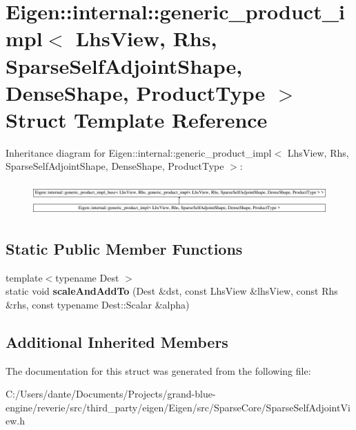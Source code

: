 \hypertarget{struct_eigen_1_1internal_1_1generic__product__impl_3_01_lhs_view_00_01_rhs_00_01_sparse_self_adj0d7cb22d06770c150f0f74fa6f4e5968}{}\section{Eigen\+::internal\+::generic\+\_\+product\+\_\+impl$<$ Lhs\+View, Rhs, Sparse\+Self\+Adjoint\+Shape, Dense\+Shape, Product\+Type $>$ Struct Template Reference}
\label{struct_eigen_1_1internal_1_1generic__product__impl_3_01_lhs_view_00_01_rhs_00_01_sparse_self_adj0d7cb22d06770c150f0f74fa6f4e5968}
Inheritance diagram for Eigen\+::internal\+::generic\+\_\+product\+\_\+impl$<$ Lhs\+View, Rhs, Sparse\+Self\+Adjoint\+Shape, Dense\+Shape, Product\+Type $>$\+:\begin{figure}[H]
\begin{center}
\leavevmode
\includegraphics[height=1.237569cm]{struct_eigen_1_1internal_1_1generic__product__impl_3_01_lhs_view_00_01_rhs_00_01_sparse_self_adj0d7cb22d06770c150f0f74fa6f4e5968}
\end{center}
\end{figure}
\subsection*{Static Public Member Functions}
\begin{DoxyCompactItemize}
\item 
\mbox{\label{struct_eigen_1_1internal_1_1generic__product__impl_3_01_lhs_view_00_01_rhs_00_01_sparse_self_adj0d7cb22d06770c150f0f74fa6f4e5968_afbe2cd4acb9e70b8b669534e9748b51b}} 
{\footnotesize template$<$typename Dest $>$ }\\static void {\bfseries scale\+And\+Add\+To} (Dest \&dst, const Lhs\+View \&lhs\+View, const Rhs \&rhs, const typename Dest\+::\+Scalar \&alpha)
\end{DoxyCompactItemize}
\subsection*{Additional Inherited Members}


The documentation for this struct was generated from the following file\+:\begin{DoxyCompactItemize}
\item 
C\+:/\+Users/dante/\+Documents/\+Projects/grand-\/blue-\/engine/reverie/src/third\+\_\+party/eigen/\+Eigen/src/\+Sparse\+Core/Sparse\+Self\+Adjoint\+View.\+h\end{DoxyCompactItemize}
